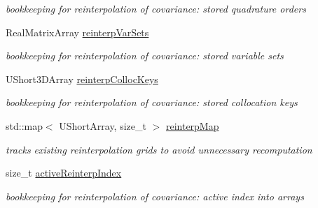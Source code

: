 \begin{DoxyCompactItemize}
\begin{DoxyCompactList}\small\item\em bookkeeping for reinterpolation of covariance\+: stored quadrature orders \end{DoxyCompactList}\item 
Real\+Matrix\+Array \hyperlink{classPecos_1_1IntegrationDriver_a836568943c74b58be86137bc53c2dd9d}{reinterp\+Var\+Sets}\label{classPecos_1_1IntegrationDriver_a836568943c74b58be86137bc53c2dd9d}

\begin{DoxyCompactList}\small\item\em bookkeeping for reinterpolation of covariance\+: stored variable sets \end{DoxyCompactList}\item 
U\+Short3\+D\+Array \hyperlink{classPecos_1_1IntegrationDriver_a12f3bb281f37a78329402207b4080931}{reinterp\+Colloc\+Keys}\label{classPecos_1_1IntegrationDriver_a12f3bb281f37a78329402207b4080931}

\begin{DoxyCompactList}\small\item\em bookkeeping for reinterpolation of covariance\+: stored collocation keys \end{DoxyCompactList}\item 
std\+::map$<$ U\+Short\+Array, size\+\_\+t $>$ \hyperlink{classPecos_1_1IntegrationDriver_aa62d46c9b84703ed6f990477167e3899}{reinterp\+Map}\label{classPecos_1_1IntegrationDriver_aa62d46c9b84703ed6f990477167e3899}

\begin{DoxyCompactList}\small\item\em tracks existing reinterpolation grids to avoid unnecessary recomputation \end{DoxyCompactList}\item 
size\+\_\+t \hyperlink{classPecos_1_1IntegrationDriver_a1c170aca651f517a8eacff61aa355559}{active\+Reinterp\+Index}\label{classPecos_1_1IntegrationDriver_a1c170aca651f517a8eacff61aa355559}

\begin{DoxyCompactList}\small\item\em bookkeeping for reinterpolation of covariance\+: active index into arrays \end{DoxyCompactList}\end{DoxyCompactItemize}
